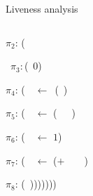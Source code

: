 \documentclass[xcolor=x11names,compress,mathserif]{beamer}
\renewcommand{\(}{\begin{columns}}
\renewcommand{\)}{\end{columns}}
\newcommand{\<}[1]{\begin{column}{#1}}
\renewcommand{\>}{\end{column}}
\begin{document}
\begin{frame}{Liveness analysis}
\begin{columns}
\begin{column}[T]{0.6\textwidth}
{\begin{uprogram}
               $\pi_2\!\!:\, $(\SIF\ \xtest

          ~$\pi_3\!\!:$(\RETURN\ $0$)
          
           \hspace*{-.08cm}    
          $\pi_4\!\!:\, $(\LET\ \xtl\  $\leftarrow$\   (\CDR\ \lista) \IN
          
	    \hspace*{-.08cm}
          $\pi_5\!\!:\,$(\LET\ \xrec\  $\leftarrow$ (\plength\ \ \xtl\ ) \IN
          
          
           \hspace*{-.08cm}   $\pi_6\!\!:\, $(\LET\ \xhd\  $\leftarrow$  $1$)  \IN
          
          
            \hspace*{-.08cm}   $\pi_7\!\!:\,$(\LET\ \xans\  $\leftarrow$ ($+$\ \ \xhd\ \ \xrec)  \IN
          
           \hspace*{-.08cm}
          $\pi_8\!\!:\, $(\RETURN\ \xans)))))))
          
      \end{uprogram}}
    \end{column}
  \end{columns}
\end{frame}












\end{document}
